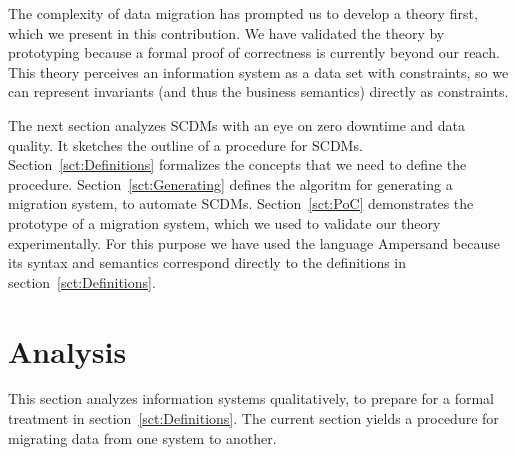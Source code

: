 \documentclass[runningheads]{llncs}
\begin{document}
   The complexity of data migration has prompted us to develop a theory first,
   which we present in this contribution.
   We have validated the theory by prototyping because a formal proof of correctness is currently beyond our reach.
   This theory perceives an information system as a data set with constraints,
   so we can represent invariants (and thus the business semantics) directly as constraints.

   The next section analyzes SCDMs with an eye on zero downtime and data quality.
   It sketches the outline of a procedure for SCDMs.
   Section~\ref{sct:Definitions} formalizes the concepts that we need to define the procedure.
   Section~\ref{sct:Generating} defines the algoritm for generating a migration system, to automate SCDMs.
   Section~\ref{sct:PoC} demonstrates the prototype of a migration system, which we used to validate our theory experimentally.
   For this purpose we have used the language Ampersand
   because its syntax and semantics correspond directly to the definitions in section~\ref{sct:Definitions}.

\section{Analysis}
\label{sct:Analysis}
   This section analyzes information systems qualitatively, to prepare for a formal treatment in section~\ref{sct:Definitions}.
   The current section yields a procedure for migrating data from one system to another.
\end{document}
